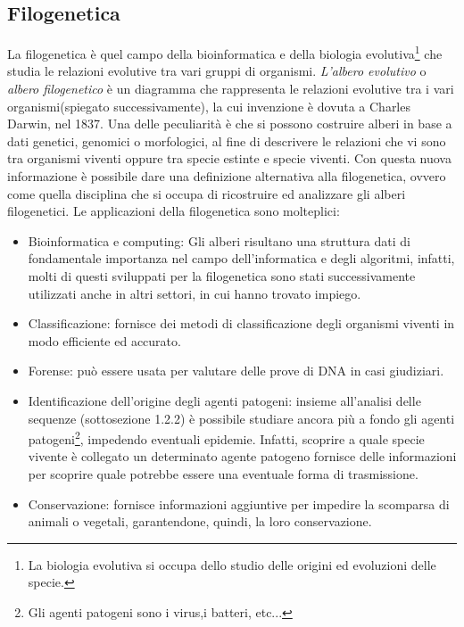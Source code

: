 \subsection{Filogenetica}
La filogenetica è quel campo della bioinformatica e della biologia evolutiva\footnote{La biologia evolutiva si occupa dello studio delle origini ed evoluzioni delle specie.} che studia le relazioni evolutive tra vari gruppi di organismi.
\newline
\textit{L'albero evolutivo} o \textit{albero filogenetico} è un diagramma che rappresenta le relazioni evolutive tra i vari organismi(spiegato successivamente), la cui invenzione è dovuta a Charles Darwin, nel 1837. Una delle peculiarità è che si possono costruire alberi in base a dati genetici, genomici o morfologici, al fine di descrivere le relazioni che vi sono tra organismi viventi oppure tra specie estinte e specie viventi. Con questa nuova informazione è possibile dare una definizione alternativa alla filogenetica, ovvero come quella disciplina che si occupa di ricostruire ed analizzare gli alberi filogenetici.
\newline
Le applicazioni della filogenetica sono molteplici:
\begin{itemize}
	\item Bioinformatica e computing: Gli alberi risultano una struttura dati di fondamentale importanza nel campo dell'informatica e degli algoritmi, infatti, molti di questi sviluppati per la filogenetica sono stati successivamente utilizzati anche in altri settori, in cui hanno trovato impiego.
	\item Classificazione: fornisce dei metodi di classificazione degli organismi viventi in modo efficiente ed accurato.
	\item Forense: può essere usata per valutare delle prove di DNA in casi giudiziari.
	\item Identificazione dell'origine degli agenti patogeni: insieme all'analisi delle sequenze (sottosezione 1.2.2) è possibile studiare ancora più a fondo gli agenti patogeni\footnote{Gli agenti patogeni sono i virus,i  batteri, etc...}, impedendo eventuali epidemie. Infatti, scoprire a quale specie vivente è collegato un determinato agente patogeno fornisce delle informazioni per scoprire quale potrebbe essere una eventuale forma di trasmissione.
	\item Conservazione: fornisce informazioni aggiuntive per impedire la scomparsa di animali o vegetali, garantendone, quindi, la loro conservazione.
\end{itemize}

